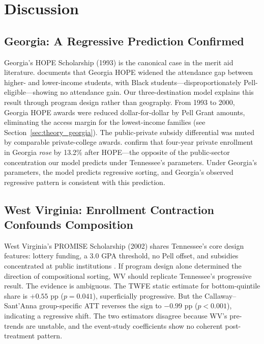 
\section{Discussion}
\label{sec:discussion}

\subsection{Georgia: A Regressive Prediction Confirmed}

Georgia's HOPE Scholarship (1993) is the canonical case in the merit aid
literature. \textcite{dynarski2000hope} documents that Georgia HOPE
widened the attendance gap between higher- and lower-income students,
with Black students---disproportionately Pell-eligible---showing no
attendance gain. Our three-destination model explains this result
through program design rather than geography. From 1993 to 2000, Georgia
HOPE awards were reduced dollar-for-dollar by Pell Grant amounts,
eliminating the access margin for the lowest-income families (see
Section~\ref{sec:theory_georgia}). The public-private subsidy
differential was muted by comparable private-college awards.
\textcite{cornwell2006enrollment} confirm that four-year private
enrollment in Georgia \emph{rose} by 13.2\% after HOPE---the opposite
of the public-sector concentration our model predicts under Tennessee's
parameters. Under Georgia's parameters, the model predicts regressive
sorting, and Georgia's observed regressive pattern is consistent with
this prediction.

\subsection{West Virginia: Enrollment Contraction Confounds Composition}

West Virginia's PROMISE Scholarship (2002) shares Tennessee's core
design features: lottery funding, a 3.0 GPA threshold, no Pell offset,
and subsidies concentrated at public institutions
\parencite{scottclayton2011money}. If program design alone determined
the direction of compositional sorting, WV should replicate Tennessee's
progressive result. The evidence is ambiguous. The TWFE static
estimate for bottom-quintile share is $+0.55$ pp ($p = 0.041$),
superficially progressive. But the Callaway--Sant'Anna group-specific
ATT reverses the sign to $-0.99$ pp ($p < 0.001$), indicating a
regressive shift. The two estimators disagree because WV's pre-trends
are unstable, and the event-study coefficients show no coherent
post-treatment pattern.

